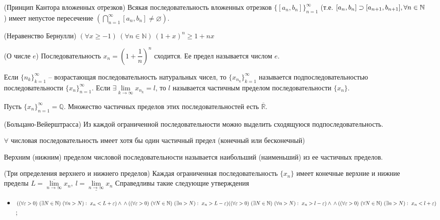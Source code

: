 \begin{multicols}{2}
\begin{theorema}{(Принцип Кантора вложенных отрезков)}{}
    Всякая последовательность вложенных отрезков $\{[a_n,b_n]\}_{n=1}^\infty$ (т.е. $\mathmbox{[a_n,b_n]\supset[a_{n+1}, b_{n+1}], \forall n \in\mathbb N}$) имеет непустое пересечение \mbox{$(\bigcap\limits_{n = 1}^\infty [a_n,b_n]\neq \varnothing)$}.
\end{theorema}
\begin{lemma}{(Неравенство Бернулли)}{}
    $(\forall x \geq -1)\ (\forall n \in\mathbb N)\ (1+x)^n \geq 1 + nx$
\end{lemma}
\begin{theorema}{(О числе $e$)}{}
    Последовательность $x_n = (1+\dfrac{1}{n})^n$ сходится. Ее предел называется числом $e$.
\end{theorema}
\begin{definition}{}{}
    Если $\{n_k\}_{k=1}^\infty$ -- возрастающая последовательность натуральных чисел, то $\{x_{n_k}\}_{k=1}^\infty$ называется подпоследовательностью последовательности $\{x_n\}_{n=1}^\infty$. Если $\exists \lim\limits_{k\to \infty} x_{n_k} = l$, то $l$ называется частичным пределом последовательности $\{x_n\}.$    
\end{definition}
\Ex Пусть $\{x_n\}_{n=1}^\infty = \mathbb Q$. Множество частичных пределов этих последовательностей есть $\overline{\mathbb R}.$
\begin{theorema}{(Больцано-Вейерштрасса)}{}
    Из каждой ограниченной последовательности можно выделить сходящуюся подпоследовательность.
\end{theorema}
\begin{proposition}{}{} $\forall$ числовая последовательность имеет хотя бы один частичный предел (конечный или бесконечный)
\end{proposition}
\begin{definition}{}{}
    Верхним (нижним) пределом числовой последовательности называется наибольший (наименьший) из ее частичных пределов.
\end{definition}
\begin{theorema}{(Три определения верхнего и нижнего пределов)}{}
    Каждая ограниченная последовательность $\{x_n\}$ имеет конечные верхние и нижние пределы $L = \overline{\lim\limits_{n\to\infty}}x_n,\ l = \underline{\lim\limits_{n\to \infty}}x_n$ Справедливы такие следующие утверждения \begin{itemize}
		\item $((\forall \varepsilon > 0)\ (\exists N\in \mathbb N)\ (\forall n > N):\ x_n < L+ \varepsilon)\wedge\\ \wedge ((\forall \varepsilon > 0)\ (\forall N\in\mathbb N)\ (\exists n > N):\ x_n > L-\varepsilon)\\((\forall \varepsilon > 0)\ (\exists N \in \mathbb N)\ (\forall n > N):\ x_n > l - \varepsilon) \wedge\\\wedge ((\forall \varepsilon > 0)\ (\forall N \in \mathbb N)\ (\exists n > N):\ x_n < l+\varepsilon)$;

\end{itemize}
\end{theorema}
\end{multicols}
